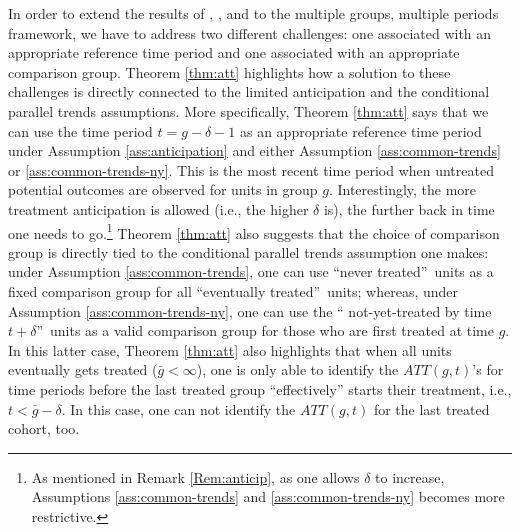 \documentclass[11pt]{article}%
\theoremstyle{plain}
\numberwithin{sassumption}{section}
\numberwithin{equation}{section}
\begin{document}
In order to extend the results of \cite{Heckman1997, Heckman1998},
\cite{Abadie2005}, and \cite{SantAnna2020} to the multiple groups, multiple
periods framework, we have to address two different challenges: one associated
with an appropriate reference time period and one associated with an
appropriate comparison group. Theorem \ref{thm:att} highlights how a solution
to these challenges is directly connected to the limited anticipation and the
conditional parallel trends assumptions. More specifically, Theorem
\ref{thm:att} says that we can use the time period $t=g-\delta-1$ as an
appropriate reference time period under Assumption \ref{ass:anticipation} and
either Assumption \ref{ass:common-trends} or \ref{ass:common-trends-ny}. This
is the most recent time period when untreated potential outcomes are observed
for units in group $g$. Interestingly, the more treatment anticipation is
allowed (i.e., the higher $\delta$ is), the further back in time one needs to
go.\footnote{As mentioned in Remark \ref{Rem:anticip}, as one allows $\delta$
to increase, Assumptions \ref{ass:common-trends} and
\ref{ass:common-trends-ny} becomes more restrictive.} Theorem \ref{thm:att}
also suggests that the choice of comparison group is directly tied to the
conditional parallel trends assumption one makes: under Assumption
\ref{ass:common-trends}, one can use \textquotedblleft never
treated\textquotedblright\ units as a fixed comparison group for all
\textquotedblleft eventually treated\textquotedblright\ units; whereas, under
Assumption \ref{ass:common-trends-ny}, one can use the \textquotedblleft
not-yet-treated by time $t+\delta$\textquotedblright\ units as a valid
comparison group for those who are first treated at time $g$. In this latter case, Theorem \ref{thm:att} also highlights that when all units eventually gets treated ($\bar{g} <\infty$), one is only able to identify the $ATT(g,t)$'s for time periods before the last treated group ``effectively'' starts their treatment, i.e., $t < \bar{g} - \delta$. In this case, one can not identify the $ATT(g,t)$ for the last treated cohort, too.
\end{document}

